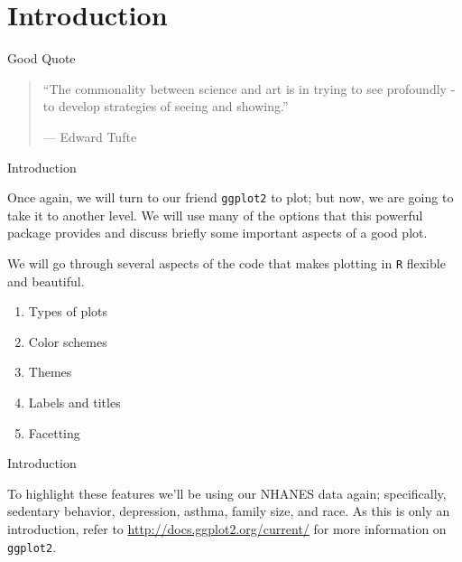 \section{Introduction}\label{introduction}

\begin{frame}{Good Quote}

\begin{quote}
``The commonality between science and art is in trying to see profoundly
- to develop strategies of seeing and showing.''

--- Edward Tufte
\end{quote}

\end{frame}

\begin{frame}[fragile]{Introduction}

Once again, we will turn to our friend \texttt{ggplot2} to plot; but
now, we are going to take it to another level. We will use many of the
options that this powerful package provides and discuss briefly some
important aspects of a good plot.

We will go through several aspects of the code that makes plotting in
\texttt{R} flexible and beautiful.

\begin{enumerate}
\def\labelenumi{\arabic{enumi}.}
\tightlist
\item
  Types of plots
\item
  Color schemes
\item
  Themes
\item
  Labels and titles
\item
  Facetting
\end{enumerate}

\end{frame}

\begin{frame}[fragile]{Introduction}

To highlight these features we'll be using our NHANES data again;
specifically, sedentary behavior, depression, asthma, family size, and
race. As this is only an introduction, refer to
\url{http://docs.ggplot2.org/current/} for more information on
\texttt{ggplot2}.

\end{frame}

